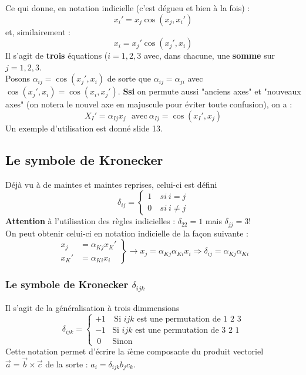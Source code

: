 Ce qui donne, en notation indicielle (c'est dégueu et bien à la fois) :
\begin{equation}
	x_i' = x_j\cos(x_j,x_i')
\end{equation}
et, similairement :
\begin{equation}
	x_i = x_j'\cos(x_j',x_i)
\end{equation}
Il s'agit de \textbf{trois} équations ($i=1,2,3$ avec, dans chacune, une \textbf{somme} sur 
$j=1,2,3$.\\
    
Posons $\alpha_{ij} = \cos(x_j',x_i)$ de sorte que $\alpha_{ij} = \alpha_{ji}$ avec $\cos(x_j',
x_i) = \cos(x_i,x_j')$. \textbf{Ssi} on permute aussi "anciens axes" et "nouveaux axes" (on 
notera le nouvel axe en majuscule pour éviter toute confusion), on a :
\begin{equation}
	X_I' = \alpha_{Ij}x_j\ \ \ \text{avec}\ \alpha_{Ij} = \cos(x_I',x_j)
\end{equation}
Un exemple d'utilisation est donné slide 13.
    
\subsection{Le symbole de Kronecker}
Déjà vu à de maintes et maintes reprises, celui-ci est défini 
\begin{equation}
	\delta_{ij} = \left\{\begin{array}{ll}
	1&\ si\ i=j  \\
	0&\ si\ i\neq j
	\end{array}\right.
\end{equation}
\textbf{Attention} à l'utilisation des règles indicielles : $\delta_{22} = 1$ mais $\delta_{jj}=3$!\\
    
On peut obtenir celui-ci en notation indicielle de la façon suivante :
\begin{equation}
	\left.\begin{array}{ll}
	x_j &= \alpha_{Kj}x_K'  \\
	x_K' &= \alpha_{Ki}x_i
	\end{array}\right\} \rightarrow x_j = \alpha_{Kj}\alpha_{Ki}x_i \Rightarrow \delta_{ij} = \alpha_{Kj}
	\alpha_{Ki}
\end{equation}
    
\subsubsection{Le symbole de Kronecker $\delta_{ijk}$}
Il s'agit de la généralisation à trois dimmensions
\begin{equation}
	\delta_{ijk} = \left\{\begin{array}{ll}
	+1&\ \text{Si $ijk$ est une permutation de 1 2 3}  \\
	-1&  \text{Si $ijk$ est une permutation de 3 2 1}\\
	\ 0& \text{Sinon}
	\end{array}\right.
\end{equation}
Cette notation permet d'écrire la $i$ème composante du produit vectoriel $\vec{a}=\vec{b}\times
\vec{c}$ de la sorte : $a_i = \delta_{ijk}b_jc_k$.
        
